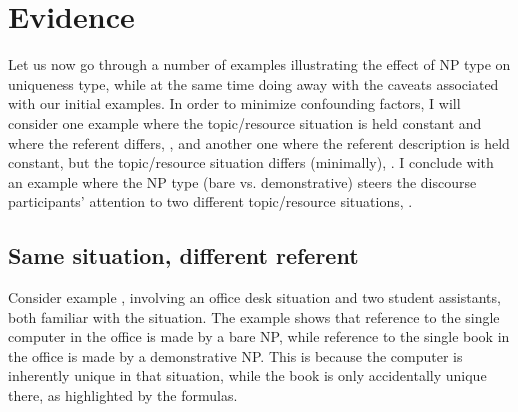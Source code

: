 \documentclass[output=paper,colorlinks,citecolor=brown,newtxmath]{langscibook}
\begin{document}
\section{Evidence}\label{simik:sec:evidence}

Let us now go through a number of examples illustrating the effect of NP type on uniqueness type, while at the same time doing away with the caveats associated with our initial examples. In order to minimize confounding factors, I will consider one example where the topic/resource situation is held constant and where the referent differs, , and another one where the referent description is held constant, but the topic/resource situation differs (minimally), . I conclude with an example where the NP type (bare vs. demonstrative) steers the discourse participants' attention to two different topic/resource situations, .

\subsection{Same situation, different referent}\label{simik:sec:same-sit}

Consider example , involving an office desk situation and two student assistants, both familiar with the situation. The example shows that reference to the single computer in the office is made by a bare NP, while reference to the single book in the office is made by a demonstrative NP. This is because the computer is inherently unique in that situation, while the book is only accidentally unique there, as highlighted by the formulas.
\end{document}
